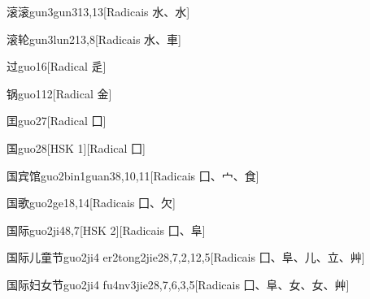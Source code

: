 \begin{entry}{滚滚}{gun3gun3}{13,13}[Radicais ⽔、⽔]
\end{entry}

\begin{entry}{滚轮}{gun3lun2}{13,8}[Radicais ⽔、⾞]
\end{entry}

\begin{entry}{过}{guo1}{6}[Radical ⾡]
\end{entry}

\begin{entry}{锅}{guo1}{12}[Radical ⾦]
\end{entry}

\begin{entry}{囯}{guo2}{7}[Radical ⼞]
\end{entry}

\begin{entry}{国}{guo2}{8}[HSK 1][Radical ⼞]
\end{entry}

\begin{entry}{国宾馆}{guo2bin1guan3}{8,10,11}[Radicais ⼞、⼧、⾷]
\end{entry}

\begin{entry}{国歌}{guo2ge1}{8,14}[Radicais ⼞、⽋]
\end{entry}

\begin{entry}{国际}{guo2ji4}{8,7}[HSK 2][Radicais ⼞、⾩]
\end{entry}

\begin{entry}{国际儿童节}{guo2ji4 er2tong2jie2}{8,7,2,12,5}[Radicais ⼞、⾩、⼉、⽴、⾋]
\end{entry}

\begin{entry}{国际妇女节}{guo2ji4 fu4nv3jie2}{8,7,6,3,5}[Radicais ⼞、⾩、⼥、⼥、⾋]
\end{entry}

